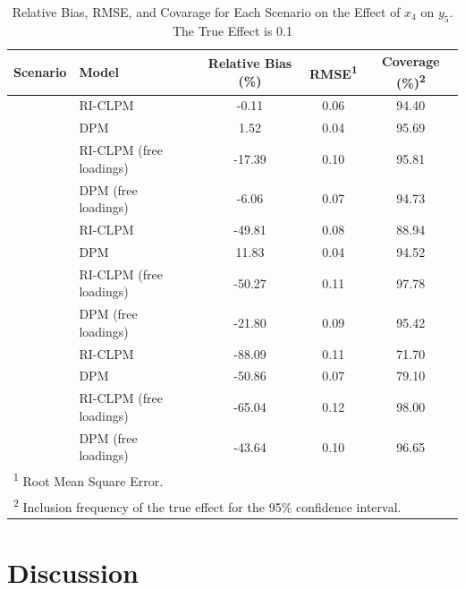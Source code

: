 \documentclass[
  a4paper,
  stu,
  floatsintext,
  donotrepeattitle]{apa7}
\begin{document}
\renewcommand{\arraystretch}{0.7}

\hypertarget{tbl-measures}{}
\begin{table}
\caption{\label{tbl-measures}Relative Bias, RMSE, and Covarage for Each Scenario on the Effect of
\(x_4\) on \(y_5\). The True Effect is 0.1 }\tabularnewline

\centering
\begin{tabular}{llccc}
\toprule
Scenario & Model & Relative Bias (\%) & RMSE\textsuperscript{1} & Coverage (\%)\textsuperscript{2}\\
\midrule
 & RI-CLPM & -0.11 & 0.06 & 94.40\\

 & DPM & 1.52 & 0.04 & 95.69\\

 & RI-CLPM (free loadings) & -17.39 & 0.10 & 95.81\\

\multirow{-4}{*}{\raggedright\arraybackslash 1} & DPM (free loadings) & -6.06 & 0.07 & 94.73\\
\cmidrule{1-5}
 & RI-CLPM & -49.81 & 0.08 & 88.94\\

 & DPM & 11.83 & 0.04 & 94.52\\

 & RI-CLPM (free loadings) & -50.27 & 0.11 & 97.78\\

\multirow{-4}{*}{\raggedright\arraybackslash 2} & DPM (free loadings) & -21.80 & 0.09 & 95.42\\
\cmidrule{1-5}
 & RI-CLPM & -88.09 & 0.11 & 71.70\\

 & DPM & -50.86 & 0.07 & 79.10\\

 & RI-CLPM (free loadings) & -65.04 & 0.12 & 98.00\\

\multirow{-4}{*}{\raggedright\arraybackslash 3} & DPM (free loadings) & -43.64 & 0.10 & 96.65\\
\bottomrule
\multicolumn{5}{l}{\rule{0pt}{1em}\textsuperscript{1} Root Mean Square Error.}\\
\multicolumn{5}{l}{\rule{0pt}{1em}\textsuperscript{2} Inclusion frequency of the true effect for the 95\% confidence interval.}\\
\end{tabular}
\end{table}

\hypertarget{discussion}{%
\section{Discussion}\label{discussion}}
\end{document}
